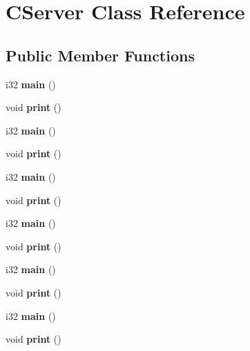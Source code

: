 \hypertarget{classCServer}{\section{C\-Server Class Reference}
\label{classCServer}
}
\subsection*{Public Member Functions}
\begin{DoxyCompactItemize}
\item 
\hypertarget{classCServer_a9162d00fe971163faa4b5d38f6b3cf10}{i32 {\bfseries main} ()}\label{classCServer_a9162d00fe971163faa4b5d38f6b3cf10}

\item 
\hypertarget{classCServer_a9294def1e5cca3665e781bfdaccb9a15}{void {\bfseries print} ()}\label{classCServer_a9294def1e5cca3665e781bfdaccb9a15}

\item 
\hypertarget{classCServer_a9162d00fe971163faa4b5d38f6b3cf10}{i32 {\bfseries main} ()}\label{classCServer_a9162d00fe971163faa4b5d38f6b3cf10}

\item 
\hypertarget{classCServer_a9294def1e5cca3665e781bfdaccb9a15}{void {\bfseries print} ()}\label{classCServer_a9294def1e5cca3665e781bfdaccb9a15}

\item 
\hypertarget{classCServer_a9162d00fe971163faa4b5d38f6b3cf10}{i32 {\bfseries main} ()}\label{classCServer_a9162d00fe971163faa4b5d38f6b3cf10}

\item 
\hypertarget{classCServer_a9294def1e5cca3665e781bfdaccb9a15}{void {\bfseries print} ()}\label{classCServer_a9294def1e5cca3665e781bfdaccb9a15}

\item 
\hypertarget{classCServer_a9162d00fe971163faa4b5d38f6b3cf10}{i32 {\bfseries main} ()}\label{classCServer_a9162d00fe971163faa4b5d38f6b3cf10}

\item 
\hypertarget{classCServer_a9294def1e5cca3665e781bfdaccb9a15}{void {\bfseries print} ()}\label{classCServer_a9294def1e5cca3665e781bfdaccb9a15}

\item 
\hypertarget{classCServer_a9162d00fe971163faa4b5d38f6b3cf10}{i32 {\bfseries main} ()}\label{classCServer_a9162d00fe971163faa4b5d38f6b3cf10}

\item 
\hypertarget{classCServer_a9294def1e5cca3665e781bfdaccb9a15}{void {\bfseries print} ()}\label{classCServer_a9294def1e5cca3665e781bfdaccb9a15}

\item 
\hypertarget{classCServer_a9162d00fe971163faa4b5d38f6b3cf10}{i32 {\bfseries main} ()}\label{classCServer_a9162d00fe971163faa4b5d38f6b3cf10}

\item 
\hypertarget{classCServer_a9294def1e5cca3665e781bfdaccb9a15}{void {\bfseries print} ()}\label{classCServer_a9294def1e5cca3665e781bfdaccb9a15}

\end{DoxyCompactItemize}


